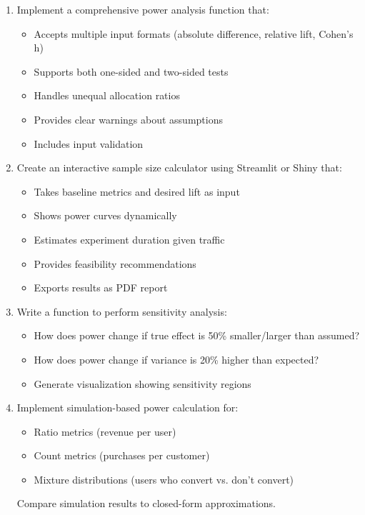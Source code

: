 \begin{enumerate}
    \item Implement a comprehensive power analysis function that:
    \begin{itemize}
        \item Accepts multiple input formats (absolute difference, relative lift, Cohen's h)
        \item Supports both one-sided and two-sided tests
        \item Handles unequal allocation ratios
        \item Provides clear warnings about assumptions
        \item Includes input validation
    \end{itemize}

    \item Create an interactive sample size calculator using Streamlit or Shiny that:
    \begin{itemize}
        \item Takes baseline metrics and desired lift as input
        \item Shows power curves dynamically
        \item Estimates experiment duration given traffic
        \item Provides feasibility recommendations
        \item Exports results as PDF report
    \end{itemize}

    \item Write a function to perform sensitivity analysis:
    \begin{itemize}
        \item How does power change if true effect is 50\% smaller/larger than assumed?
        \item How does power change if variance is 20\% higher than expected?
        \item Generate visualization showing sensitivity regions
    \end{itemize}

    \item Implement simulation-based power calculation for:
    \begin{itemize}
        \item Ratio metrics (revenue per user)
        \item Count metrics (purchases per customer)
        \item Mixture distributions (users who convert vs. don't convert)
    \end{itemize}
    Compare simulation results to closed-form approximations.
\end{enumerate}

